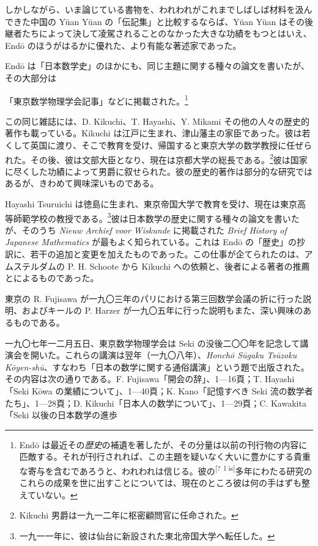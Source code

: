 \documentclass[11pt]{article}
\newcommand{\scanpage}[2]{\clearpage\setcounter{footnote}{0}\noindent{\footnotesize\color{gray}PDF #1 頁 · #2}\par\medskip}
\newcommand{\unclear}[1]{\textsuperscript{[?~#1]}}
\begin{document}
しかしながら、いま論じている書物を、われわれがこれまでしばしば材料を汲んできた中国の Yüan Yüan の「伝記集」と比較するならば、Yüan Yüan はその後継者たちによって決して凌駕されることのなかった大きな功績をもつとはいえ、Endō のほうがはるかに優れた、より有能な著述家であった。

Endō は「日本数学史」のほかにも、同じ主題に関する種々の論文を書いたが、その大部分は

\scanpage{0343}{印刷頁 329}
\noindent 「東京数学物理学会記事」などに掲載された。\footnote{Endō は最近その\emph{歴史}の補遺を著したが、その分量は以前の刊行物の内容に匹敵する。それが刊行されれば、この主題を疑いなく大いに豊かにする貴重な寄与を含むであろうと、われわれは信じる。彼の\unclear{l is}多年にわたる研究のこれらの成果を世に出すことについては、現在のところ彼は何の手はずも整えていない。}

この同じ雑誌には、D. Kikuchi、T. Hayashi、Y. Mikami その他の人々の歴史的著作も載っている。Kikuchi は江戸に生まれ、津山藩主の家臣であった。彼は若くして英国に渡り、そこで教育を受け、帰国すると東京大学の数学教授に任ぜられた。その後、彼は文部大臣となり、現在は京都大学の総長である。\footnote{Kikuchi 男爵は一九一二年に枢密顧問官に任命された。}彼は国家に尽くした功績によって男爵に叙せられた。彼の歴史的著作は部分的な研究ではあるが、きわめて興味深いものである。

Hayashi Tsuruichi は徳島に生まれ、東京帝国大学で教育を受け、現在は東京高等師範学校の教授である。\footnote{一九一一年に、彼は仙台に新設された東北帝国大学へ転任した。}彼は日本数学の歴史に関する種々の論文を書いたが、そのうち \emph{Nieuw Archief voor Wiskunde} に掲載された \emph{Brief History of Japanese Mathematics} が最もよく知られている。これは Endō の「歴史」の抄訳に、若干の追加と変更を加えたものであった。この仕事が企てられたのは、アムステルダムの P. H. Schoote から Kikuchi への依頼と、後者による著者の推薦とによるものであった。

東京の R. Fujisawa が一九〇三年のパリにおける第三回数学会議の折に行った説明、およびキールの P. Harzer が一九〇五年に行った説明もまた、深い興味のあるものである。

一九〇七年一二月五日、東京数学物理学会は Seki の没後二〇〇年を記念して講演会を開いた。これらの講演は翌年（一九〇八年）、\emph{Honchō Sūgaku Tsūzoku Kōyen-shū}、すなわち「日本の数学に関する通俗講演」という題で出版された。その内容は次の通りである。F. Fujisawa「開会の辞」、1---16頁；T. Hayashi「Seki Kōwa の業績について」、1---40頁；K. Kano「記憶すべき Seki 流の数学者たち」、1---28頁；D. Kikuchi「日本人の数学について」、1---29頁；C. Kawakita「Seki 以後の日本数学の進歩
\end{document}
